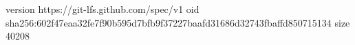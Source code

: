 version https://git-lfs.github.com/spec/v1
oid sha256:602f47eaa32fe7f90b595d7bfb9f37227baafd31686d32743fbaffd850715134
size 40208
